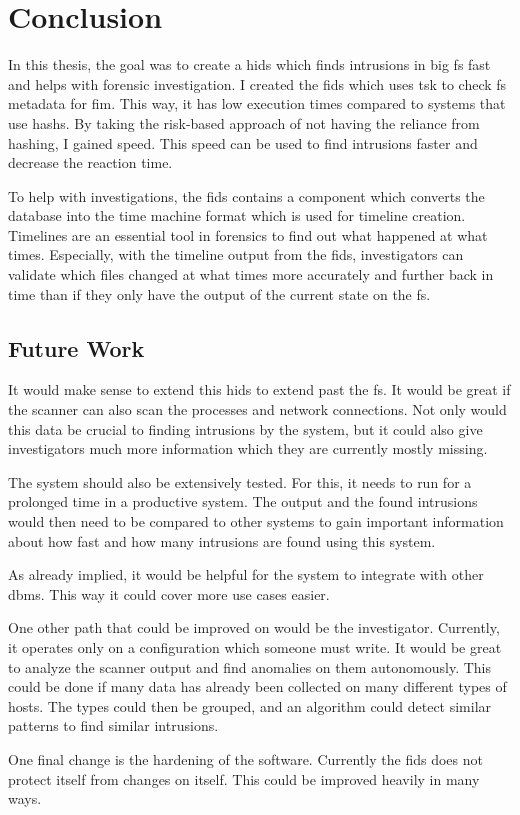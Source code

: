 
\chapter{Conclusion}
\label{sec:Conclusion}
In this thesis, the goal was to create a \gls{hids} which finds \glspl{intrusion} in big \gls{fs} fast and helps with forensic investigation. I created the \gls{fids} which uses \gls{tsk} to check \gls{fs} \gls{metadata} for \gls{fim}. This way, it has low execution times compared to systems that use \glspl{hash}. By taking the risk-based approach of not having the reliance from hashing, I gained speed. This speed can be used to find \glspl{intrusion} faster and decrease the reaction time. 

To help with investigations, the \gls{fids} contains a component which converts the database into the time machine format which is used for timeline creation. Timelines are an essential tool in forensics to find out what happened at what times. Especially, with the timeline output from the \gls{fids}, investigators can validate which files changed at what times more accurately and further back in time than if they only have the output of the current state on the \gls{fs}. 

\section{Future Work}
\label{sec:future:work}


It would make sense to extend this \gls{hids} to extend past the \gls{fs}. It would be great if the scanner can also scan the processes and network connections. Not only would this data be crucial to finding \glspl{intrusion} by the system, but it could also give investigators much more information which they are currently mostly missing.

The system should also be extensively tested. For this, it needs to run for a prolonged time in a productive system. The output and the found \glspl{intrusion} would then need to be compared to other systems to gain important information about how fast and how many \glspl{intrusion} are found using this system. 

As already implied, it would be helpful for the system to integrate with other \gls{dbms}. This way it could cover more use cases easier. 

One other path that could be improved on would be the investigator. Currently, it operates only on a configuration which someone must write. It would be great to analyze the scanner output and find anomalies on them autonomously. This could be done if many data has already been collected on many different types of hosts. The types could then be grouped, and an algorithm could detect similar patterns to find similar \glspl{intrusion}. 

One final change is the hardening of the software. Currently the \gls{fids} does not protect itself from changes on itself. This could be improved heavily in many ways. 
